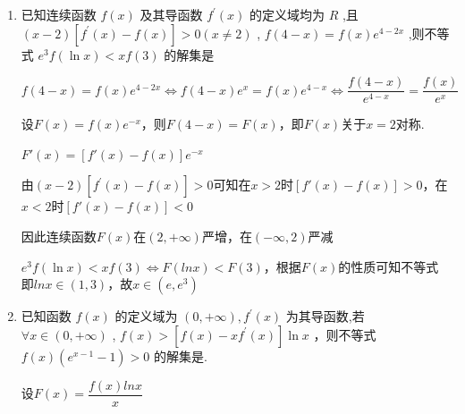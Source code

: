 \begin{enumerate}
\begin{enumerate}
\begin{jieda}
            ${f}^{\prime }\left( x\right)  < {3f}\left( x\right)  + 6 \Longleftrightarrow F'(x) < 3F(x)$，$\left(\dfrac{F(x)}{e^{3x}}\right)' = \dfrac{F'(x) - 3F(x)}{e^{3x}} < 0$

            $F(t) > \dfrac{e^{3t}}{e^3} \Longleftrightarrow \dfrac{F(t)}{e^{3t}} > \dfrac{F(1)}{e^3}$，故$t < 1$，即$lnx < 1$，解得$x \in (0, e)$
        \end{jieda}
        \item 已知连续函数 $f\left( x\right)$ 及其导函数 ${f}^{\prime }\left( x\right)$ 的定义域均为 ${R}$ ,且 $\left( {x - 2}\right) \left\lbrack  {{f}^{\prime }\left( x\right)  - f\left( x\right) }\right\rbrack  > 0 (x \neq 2)$ , $f\left( {4 - x}\right)  = f\left( x\right) {{e}}^{4 - {2x}}$ ,则不等式 ${{e}}^{3}f\left( {\ln x}\right)  < {xf}\left( 3\right)$ 的解集是
        \begin{jieda}

            $f\left( {4 - x}\right)  = f\left( x\right) {{e}}^{4 - {2x}} \Longleftrightarrow f(4-x)e^x = f(x)e^{4-x} \Longleftrightarrow \dfrac{f(4-x)}{e^{4-x}} = \dfrac{f(x)}{e^x}$

            设$F(x) = f(x)e^{-x}$，则$F(4-x) = F(x)$，即$F(x)$关于$x = 2$对称. 

            $F'(x) = [f'(x)-f(x)]e^{-x}$

            由$\left( {x - 2}\right) \left\lbrack  {{f}^{\prime }\left( x\right)  - f\left( x\right) }\right\rbrack  > 0$可知在$x>2$时$[f'(x)-f(x)] > 0$，在$x < 2$时$[f'(x)-f(x)] < 0$

            因此连续函数$F(x)$在$(2, +\infty)$严增，在$(-\infty, 2)$严减

            ${{e}}^{3}f\left( {\ln x}\right)  < {xf}\left( 3\right) \Longleftrightarrow F(lnx) < F(3)$，根据$F(x)$的性质可知不等式即$lnx \in (1,3)$，故$x \in \left( {{e},{{e}}^{3}}\right)$
        \end{jieda}


        \item 已知函数 $f\left( x\right)$ 的定义域为 $\left( {0, + \infty }\right) ,{f}^{\prime }\left( x\right)$ 为其导函数,若 $\forall x \in  \left( {0, + \infty }\right)$ , $f\left( x\right)  > \left\lbrack  {f\left( x\right)  - x{f}^{\prime }\left( x\right) }\right\rbrack  \ln x$ ，则不等式 $f\left( x\right) \left( {{{e}}^{x - 1} - 1}\right)  > 0$ 的解集是.
        \begin{jieda}
            设$F(x) = \dfrac{f(x)lnx}{x}$
            

\end{jieda}
\end{enumerate}
\end{enumerate}
